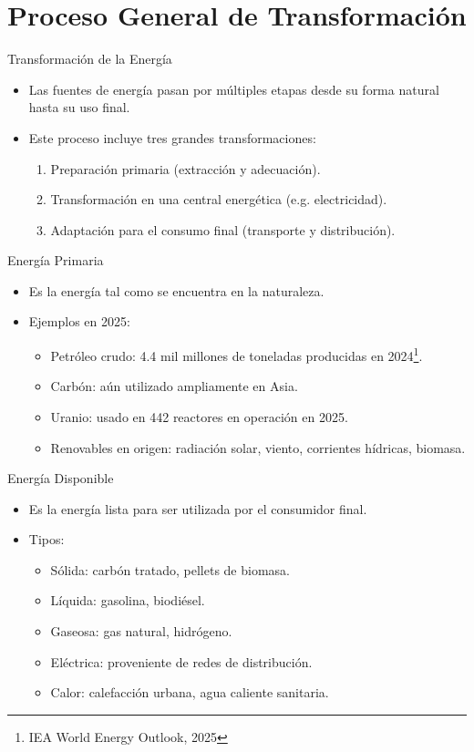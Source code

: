\documentclass[main.tex]{subfiles}
\begin{document}
\section{Proceso General de Transformación}

\begin{frame}{Transformación de la Energía}
  \begin{itemize}
    \item Las fuentes de energía pasan por múltiples etapas desde su forma natural hasta su uso final.
    \item Este proceso incluye tres grandes transformaciones: 
    \begin{enumerate}
      \item Preparación primaria (extracción y adecuación).
      \item Transformación en una central energética (e.g. electricidad).
      \item Adaptación para el consumo final (transporte y distribución).
    \end{enumerate}
  \end{itemize}
\end{frame}

\begin{frame}{Energía Primaria}
  \begin{itemize}
    \item Es la energía tal como se encuentra en la naturaleza.
    \item Ejemplos en 2025:
    \begin{itemize}
      \item Petróleo crudo: 4.4 mil millones de toneladas producidas en 2024\footnote{IEA World Energy Outlook, 2025}.
      \item Carbón: aún utilizado ampliamente en Asia.
      \item Uranio: usado en 442 reactores en operación en 2025.
      \item Renovables en origen: radiación solar, viento, corrientes hídricas, biomasa.
    \end{itemize}
  \end{itemize}
\end{frame}


\begin{frame}{Energía Disponible}
  \begin{itemize}
    \item Es la energía lista para ser utilizada por el consumidor final.
    \item Tipos:
    \begin{itemize}
      \item Sólida: carbón tratado, pellets de biomasa.
      \item Líquida: gasolina, biodiésel.
      \item Gaseosa: gas natural, hidrógeno.
      \item Eléctrica: proveniente de redes de distribución.
      \item Calor: calefacción urbana, agua caliente sanitaria.
    \end{itemize}
  \end{itemize}
\end{frame}
\end{document}
